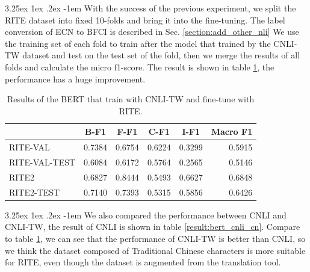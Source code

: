 \documentclass[12pt]{article}
\makeatletter
\renewcommand\paragraph{\@startsection{paragraph}{5}{\z@}%
  {3.25ex \@plus1ex \@minus.2ex}%
  {-1em}%
  {\normalfont\normalsize\bfseries}}
\makeatother
\begin{document}
\begin{CJK*}{UTF8}{bkai}
\begin{spacing}{1.77}
\paragraph{}
With the success of the previous experiment, we split the RITE dataset into fixed 10-folds and bring it into the fine-tuning. The label conversion of ECN to BFCI is described in Sec. \ref{section:add_other_nli}  We use the training set of each fold to train after the model that trained by the CNLI-TW dataset and test on the test set of the fold, then we merge the results of all folds and calculate the micro f1-score. The result is shown in table \ref{result:bert_cnli_transfer}, the performance has a huge improvement.

\begin{table}[H]
  \centering
  \setlength{\extrarowheight}{-3pt}
  \begin{tabular}{|l|r|r|r|r|r|}
  \hline
   & \multicolumn{1}{c|}{B-F1} & \multicolumn{1}{c|}{F-F1} & \multicolumn{1}{c|}{C-F1} & \multicolumn{1}{c|}{I-F1} & \multicolumn{1}{c|}{Macro F1} \\ \hline
  RITE-VAL & 0.7384 & 0.6754 & 0.6224 & 0.3299 & 0.5915 \\ \hline
  RITE-VAL-TEST & 0.6084 & 0.6172 & 0.5764 & 0.2565 & 0.5146 \\ \hline
  RITE2 & 0.6827 & 0.8444 & 0.5493 & 0.6627 & 0.6848 \\ \hline
  RITE2-TEST & 0.7140 & 0.7393 & 0.5315 & 0.5856 & 0.6426 \\ \hline
  \end{tabular}
  \caption{Results of the BERT that train with CNLI-TW and fine-tune with RITE.}
  \label{result:bert_cnli_transfer}
\end{table}

\paragraph{}
We also compared the performance between CNLI and CNLI-TW, the result of CNLI is shown in table \ref{result:bert_cnli_cn}. Compare to table \ref{result:bert_cnli_transfer}, we can see that the performance of CNLI-TW is better than CNLI, so we think the dataset composed of Traditional Chinese characters is more suitable for RITE, even though the dataset is augmented from the translation tool.


\end{spacing}
\end{CJK*}
\end{document}

